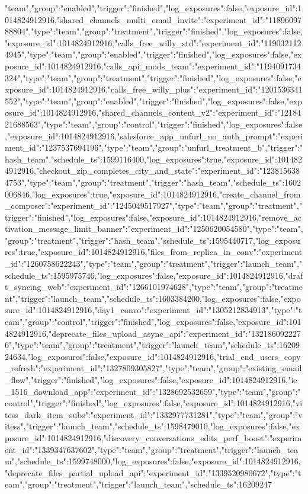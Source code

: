 {"team","group":"enabled","trigger":"finished","log_exposures":false,"exposure_id":1014824912916},"shared_channels_multi_email_invite":{"experiment_id":"1189609788804","type":"team","group":"treatment","trigger":"finished","log_exposures":false,"exposure_id":1014824912916},"calls_free_willy_std":{"experiment_id":"1190321124945","type":"team","group":"enabled","trigger":"finished","log_exposures":false,"exposure_id":1014824912916},"calls_api_mods_team":{"experiment_id":"1194091734324","type":"team","group":"treatment","trigger":"finished","log_exposures":false,"exposure_id":1014824912916},"calls_free_willy_plus":{"experiment_id":"1201536341552","type":"team","group":"enabled","trigger":"finished","log_exposures":false,"exposure_id":1014824912916},"shared_channels_content_v2":{"experiment_id":"1218421688563","type":"team","group":"control","trigger":"finished","log_exposures":false,"exposure_id":1014824912916},"salesforce_app_unfurl_no_auth_prompt":{"experiment_id":"1237537694196","type":"team","group":"unfurl_treatment_b","trigger":"hash_team","schedule_ts":1599116400,"log_exposures":true,"exposure_id":1014824912916},"checkout_zip_completes_city_and_state":{"experiment_id":"1238156384753","type":"team","group":"treatment","trigger":"hash_team","schedule_ts":1602006846,"log_exposures":true,"exposure_id":1014824912916},"create_channel_from_composer":{"experiment_id":"1245049517927","type":"team","group":"treatment","trigger":"finished","log_exposures":false,"exposure_id":1014824912916},"remove_activation_message_limit_banner":{"experiment_id":"1250620054580","type":"team","group":"treatment","trigger":"hash_team","schedule_ts":1595440717,"log_exposures":true,"exposure_id":1014824912916},"files_from_replica_in_conv":{"experiment_id":"1260758622243","type":"team","group":"treatment","trigger":"launch_team","schedule_ts":1595975746,"log_exposures":false,"exposure_id":1014824912916},"draft_syncing_web":{"experiment_id":"1266101974628","type":"team","group":"treatment","trigger":"launch_team","schedule_ts":1603384200,"log_exposures":false,"exposure_id":1014824912916},"day1_convo":{"experiment_id":"1305212834913","type":"team","group":"control","trigger":"finished","log_exposures":false,"exposure_id":1014824912916},"deprecate_files_upload_async_api":{"experiment_id":"1321860922276","type":"team","group":"treatment","trigger":"launch_team","schedule_ts":1620924634,"log_exposures":false,"exposure_id":1014824912916},"trial_end_users_copy_refresh":{"experiment_id":"1327809305827","type":"team","group":"existing_email_flow","trigger":"finished","log_exposures":false,"exposure_id":1014824912916},"ie_1516_download_app":{"experiment_id":"1328692532659","type":"team","group":"control","trigger":"finished","log_exposures":false,"exposure_id":1014824912916},"vitess_dark_item_subs":{"experiment_id":"1332977731281","type":"team","group":"vitess","trigger":"launch_team","schedule_ts":1598479010,"log_exposures":false,"exposure_id":1014824912916},"discovery_conversations_edits_perf_boost":{"experiment_id":"1339347637602","type":"team","group":"treatment","trigger":"launch_team","schedule_ts":1599748000,"log_exposures":false,"exposure_id":1014824912916},"deprecate_files_partial_upload_api":{"experiment_id":"1339520980672","type":"team","group":"treatment","trigger":"launch_team","schedule_ts":16209247}

